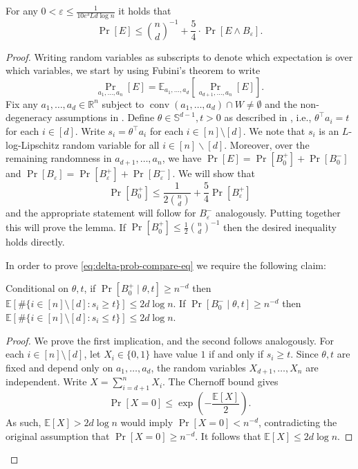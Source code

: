 \documentclass{theoretics}
\newcommand{\R}{\mathbb R}
\newcommand{\E}{\mathbb E}
\newcommand{\T}{\top}
\newcommand{\sfe}{\mathbb{S}^{d-1}}
\newcommand{\eps}{\varepsilon} %
\newcommand{\conv}{\operatorname{conv}}
\begin{document}
\begin{lemma}\label{lem:delta-prob-compare}
For any $0 < \eps \leq \frac{1}{10e^3 L d\log n}$ it holds that
\[
\Pr[E] \leq \binom{n}{d}^{-1} + \frac{5}{4} \cdot \Pr[E \wedge B_\eps].
\]
\end{lemma}
\begin{proof}
    Writing random variables as subscripts to denote which expectation is over which variables,
    we start by using Fubini's theorem to write
    $$\Pr_{a_1,\dots,a_n}[E] = \E_{a_1,\dots,a_d}[ \Pr_{a_{d+1},\dots,a_n}[E]].$$
    Fix any $a_1,\dots,a_d \in \R^n$ subject to \mbox{$\conv(a_1,\dots,a_d) \cap W \neq \emptyset$} and the non-degeneracy assumptions in .
    Define $\theta \in \sfe, t > 0$ as described in , i.e., $\theta^\top a_i = t$ for each $i \in [d]$.
    Write $s_i = \theta^\T a_i$ for each $i \in [n]\setminus [d]$.
    We note that $s_i$ is an $L$-log-Lipschitz random variable for all $i \in [n] \backslash [d]$.
    Moreover, over the remaining randomness in $a_{d+1},\dots,a_n$, we have
    $\Pr[E] = \Pr[B_0^+] + \Pr[B_0^-]$ and $\Pr[B_\eps] = \Pr[B_\eps^+] + \Pr[B_\eps^-]$.
    We will show that
    \begin{equation}
        \Pr[B_0^+] \leq \frac{1}{2\binom{n}{d}} + \frac 5 4 \Pr[B_\eps^+] \label{eq:delta-prob-compare-eq}
    \end{equation}
    and the appropriate statement will follow for $B_\eps^-$ analogously.
    Putting together this will prove the lemma.
    If $\Pr[B_0^+] \leq \frac{1}{2}\binom n d^{-1}$ then the desired inequality holds directly.
    
    In order to prove \eqref{eq:delta-prob-compare-eq} we require the following claim:
    \begin{claim}\label{claim:highprobabilityimpliesfewnearbypoints}
        Conditional on $\theta, t$, if $\Pr[B_0^+ \mid \theta, t] \geq n^{-d}$
        then $\E[\#\{i \in [n] \setminus [d] : s_i \geq t\}] \leq 2 d\log n$.
        If $\Pr[B_0^- \mid \theta, t] \geq n^{-d}$
        then $\E[\#\{i \in [n] \setminus [d] : s_i \leq t\}] \leq 2 d\log n$.
    \end{claim}
    \begin{proof}
        We prove the first implication, and the second follows analogously.
        For each $i \in [n]\setminus[d]$, let $X_i \in \{0,1\}$ have value $1$
        if and only if $s_i \geq t$. Since $\theta, t$ are fixed
        and depend only on $a_1,\dots,a_d$, the random variables
        $X_{d+1},\dots,X_n$ are independent.
        Write $X = \sum_{i=d+1}^n X_i$. The Chernoff bound gives
        \[\Pr[X = 0]
        \leq \exp\left(-\frac{\E[X]}{2}\right).\]
        As such, \(\E[X] > 2d\log n\) would imply \(\Pr[X = 0] < n^{-d}\),
        contradicting the original assumption that \(\Pr[X = 0] \geq n^{-d}.\)
        It follows that \(\E[X] \leq 2d\log n\).
    \end{proof}


\end{proof}
\end{document}

